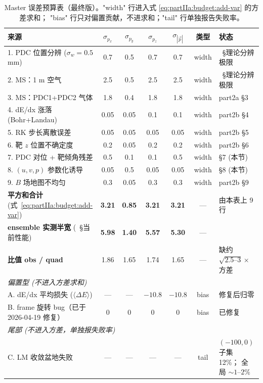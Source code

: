 \begin{table}[ht]
  \centering
  \footnotesize
  \caption{Master 误差预算表（最终版）。"width" 行进入式 \eqref{eq:partIIa:budget:add-var} 的方差求和；
    "bias" 行只对偏置贡献，不进求和；"tail" 行单独报告失败率。}
  \label{tab:partIIc:budget:master-final}
  \begin{tabular}{l|cccc|c|l}
    \hline
    来源 & $\sigma_{p_x}$ & $\sigma_{p_y}$ & $\sigma_{p_z}$ & $\sigma_{|\vec p|}$ &
      类型 & 状态 \\
    \hline
    1. PDC 位置分辨 ($\sigma_w{=}0.5$ mm)         & 0.7   & 0.5   & 0.7   & 0.7   & width  & \StatusReport{}~§理论分辨极限 \\
    2. MS：1 m 空气                               & 2.5   & 0.5   & 2.5   & 2.5   & width  & \StatusReport{}~§理论分辨极限 \\
    3. MS：PDC1+PDC2 气体                         & 1.8   & 0.4   & 1.8   & 1.8   & width  & part2a §3 \\
    4. dE/dx 涨落 (Bohr+Landau)                   & 0.05  & 0.05  & 0.1   & 0.1   & width  & part2b §4 \\
    5. RK 步长离散误差                            & 0.05  & 0.05  & 0.05  & 0.05  & width  & part2b §5 \\
    6. 靶 $z$ 位置不确定度                        & 0.2   & 0.05  & 0.2   & 0.2   & width  & part2b §6 \\
    7. PDC 对位 + 靶倾角残差                      & 0.5   & 0.1   & 0.1   & 0.5   & width  & §7 (本节) \\
    8. $(u,v,p)$ 参数化诱导                       & 0.05  & 0.5   & 0.05  & 0.05  & width  & §8 (本节) \\
    9. $B$ 场地图不均匀                           & 0.3   & 0.05  & 0.3   & 0.3   & width  & part2b §9 \\
    \hline
    \textbf{平方和合计} (式~\eqref{eq:partIIa:budget:add-var}) &
        \textbf{3.21} & \textbf{0.85} & \textbf{3.21} & \textbf{3.21} & --- & 由本表上 9 行 \\
    \hline
    \textbf{ensemble 实测半宽} (\StatusReport{}~§当前性能) &
        \textbf{5.98} & \textbf{1.40} & \textbf{5.57} & \textbf{5.30} & --- & \DeepDiveData{} \\
    \hline
    \textbf{比值 obs / quad} & 1.86 & 1.65 & 1.74 & 1.65 & --- & 缺约 $\sqrt{2.5\text{--}3}\times$ 方差 \\
    \hline
    \multicolumn{7}{l}{\emph{偏置型 (不进入方差求和)}} \\
    A. dE/dx 平均损失 ($\langle\Delta E\rangle$)  & --- & --- & $-10.8$ & $-10.8$ & bias & 修复后归零 \\
    B. frame 旋转 bug（已于 2026-04-19 修复）     & 0   & 0   & 0   & 0   & bias & 已修复 \\
    \hline
    \multicolumn{7}{l}{\emph{尾部 (不进入方差，单独报失败率)}} \\
    C. LM 收敛盆地失败                            & --- & --- & --- & --- & tail & \makecell[l]{$(-100, 0)$ 子集 12\%；\\ 全局 $\sim 1$--$2\%$} \\
    \hline
  \end{tabular}
\end{table}

